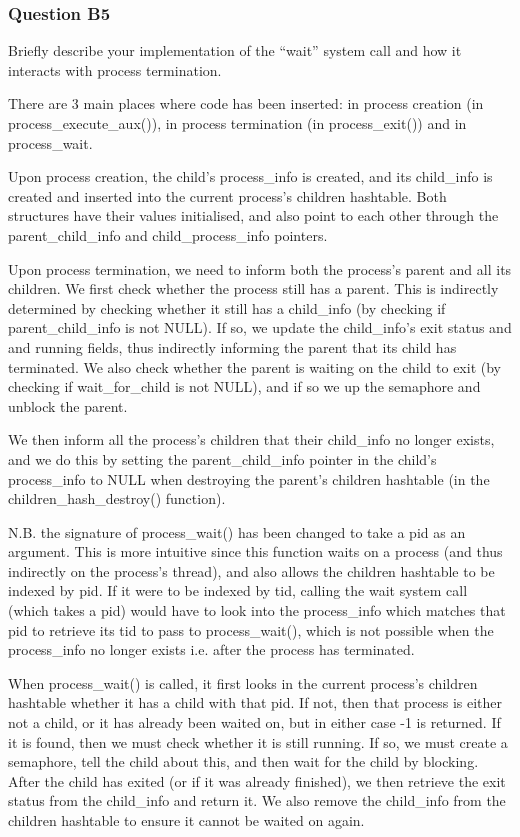 \subsubsection*{Question B5} %
Briefly describe your implementation of the ``wait'' system call and how it interacts with process termination.

There are 3 main places where code has been inserted: in process creation (in process\_execute\_aux()), in process termination (in process\_exit()) and in process\_wait.

Upon process creation, the child's process\_info is created, and its child\_info is created and inserted into the current process's children hashtable. Both structures have their values initialised, and also point to each other through the parent\_child\_info and child\_process\_info pointers.

Upon process termination, we need to inform both the process's parent and all its children. We first check whether the process still has a parent. This is indirectly determined by checking whether it still has a child\_info (by checking if parent\_child\_info is not NULL). If so, we update the child\_info's exit status and and running fields, thus indirectly informing the parent that its child has terminated. We also check whether the parent is waiting on the child to exit (by checking if wait\_for\_child is not NULL), and if so we up the semaphore and unblock the parent.

We then inform all the process's children that their child\_info no longer exists, and we do this by setting the parent\_child\_info pointer in the child's process\_info to NULL when destroying the parent's children hashtable (in the children\_hash\_destroy() function).

N.B. the signature of process\_wait() has been changed to take a pid as an argument. This is more intuitive since this function waits on a process (and thus indirectly on the process's thread), and also allows the children hashtable to be indexed by pid. If it were to be indexed by tid, calling the wait system call (which takes a pid) would have to look into the process\_info which matches that pid to retrieve its tid to pass to process\_wait(), which is not possible when the process\_info no longer exists i.e. after the process has terminated.

When process\_wait() is called, it first looks in the current process's children hashtable whether it has a child with that pid. If not, then that process is either not a child, or it has already been waited on, but in either case -1 is returned. If it is found, then we must check whether it is still running. If so, we must create a semaphore, tell the child about this, and then wait for the child by blocking. After the child has exited (or if it was already finished), we then retrieve the exit status from the child\_info and return it. We also remove the child\_info from the children hashtable to ensure it cannot be waited on again.


